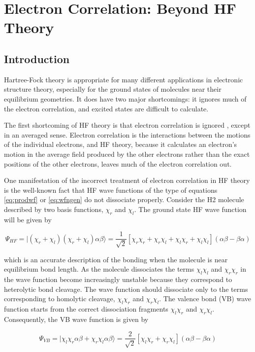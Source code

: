 \chapter{Electron Correlation: Beyond HF Theory}

\section{Introduction}
Hartree-Fock theory is appropriate for many different applications in
electronic structure theory, especially for the ground states of
molecules near their equilibrium geometries. It does have two major
shortcomings: it ignores much of the electron correlation, and excited
states are difficult to calculate.  

The first shortcoming of HF theory is that electron correlation is
ignored \cite{Szabo82}, except in an averaged sense. Electron
correlation is the interactions between the motions of the individual
electrons, and HF theory, because it calculates an electron's
motion in the average field produced by the other electrons rather
than the exact positions of the other electrons, leaves much of the
electron correlation out. 

One manifestation of the incorrect treatment of electron correlation
in HF theory is the well-known fact that HF wave
functions of the type of equations \ref{eq:prodwf} or \ref{eq:wfngen} do not
dissociate properly. Consider the H2 molecule
described by two basis functions, $\chi_r$ and $\chi_l$. The
ground state HF wave function will be given by 

\begin{equation}
  \Psi_{HF} = |(\chi_r+\chi_l)(\chi_r+\chi_l)\alpha\beta \rangle 
  = \frac{1}{\sqrt{2}}[\chi_r\chi_r + \chi_r\chi_l + \chi_l\chi_r
	+ \chi_l\chi_l](\alpha\beta-\beta\alpha)
\end{equation}

\noindent which is an accurate description of the bonding when the
molecule is near equilibrium bond length. As the molecule dissociates
the terms $\chi_l\chi_l$ and $\chi_r\chi_r$ in the wave function
become increasingly unstable because they correspond to heterolytic
bond cleavage. The wave function should dissociate only to the terms
corresponding to homolytic cleavage, $\chi_l\chi_r$ and
$\chi_r\chi_l$. The valence bond (VB) wave function starts from the
correct dissociation fragments $\chi_l\chi_r$ and $\chi_r\chi_l$.
Consequently, the VB wave function is given by

\begin{equation}
  \Psi_{VB} = |\chi_l\chi_r\alpha\beta+\chi_r\chi_l\alpha\beta
	\rangle 
	= \frac{2}{\sqrt{2}}[\chi_l\chi_r + \chi_r\chi_l]
	(\alpha\beta-\beta\alpha)
\label{eq:vbwfn}
\end{equation}

